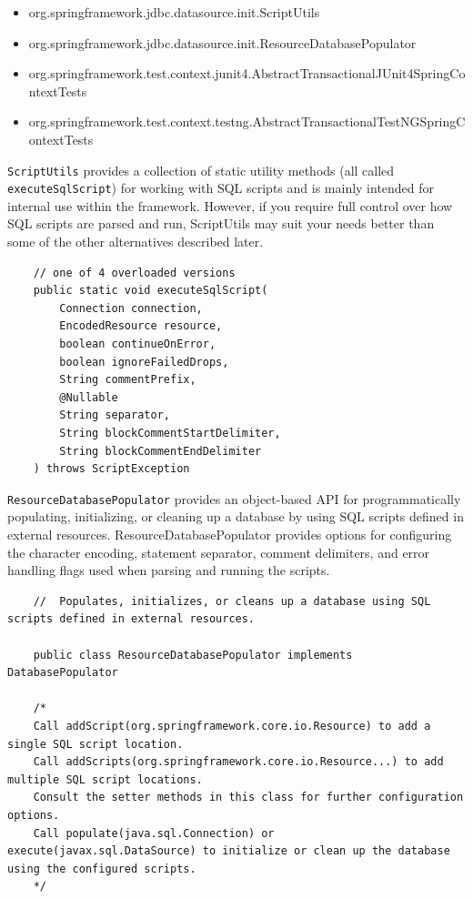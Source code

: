 \documentclass{scrartcl}
\begin{document}
\begin{itemize}
    \item org.springframework.jdbc.datasource.init.ScriptUtils
    \item org.springframework.jdbc.datasource.init.ResourceDatabasePopulator
    \item org.springframework.test.context.junit4.AbstractTransactionalJUnit4SpringContextTests
    \item org.springframework.test.context.testng.AbstractTransactionalTestNGSpringContextTests
\end{itemize}

\lstinline|ScriptUtils| provides a collection of static utility methods (all called \lstinline|executeSqlScript|) for working with SQL scripts and is mainly intended for internal use within the framework. However, if you require full control over how SQL scripts are parsed and run, ScriptUtils may suit your needs better than some of the other alternatives described later.

\begin{lstlisting}
    // one of 4 overloaded versions
    public static void executeSqlScript(
        Connection connection,
        EncodedResource resource,
        boolean continueOnError,
        boolean ignoreFailedDrops,
        String commentPrefix,
        @Nullable
        String separator,
        String blockCommentStartDelimiter,
        String blockCommentEndDelimiter
    ) throws ScriptException
\end{lstlisting}

\lstinline|ResourceDatabasePopulator| provides an object-based API for programmatically populating, initializing, or cleaning up a database by using SQL scripts defined in external resources. ResourceDatabasePopulator provides options for configuring the character encoding, statement separator, comment delimiters, and error handling flags used when parsing and running the scripts.

\begin{lstlisting}
    //  Populates, initializes, or cleans up a database using SQL scripts defined in external resources.

    public class ResourceDatabasePopulator implements DatabasePopulator

    /*
    Call addScript(org.springframework.core.io.Resource) to add a single SQL script location.
    Call addScripts(org.springframework.core.io.Resource...) to add multiple SQL script locations.
    Consult the setter methods in this class for further configuration options.
    Call populate(java.sql.Connection) or execute(javax.sql.DataSource) to initialize or clean up the database using the configured scripts.
    */

\end{lstlisting}
\end{document}
